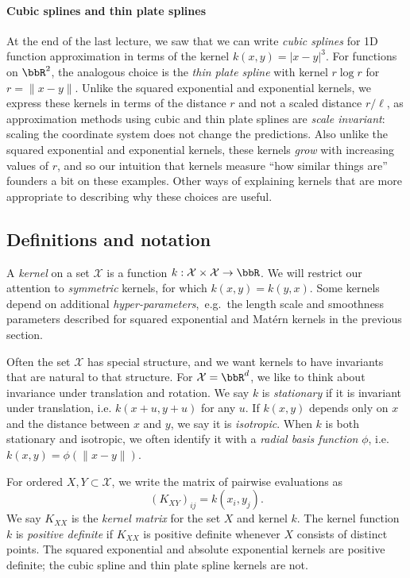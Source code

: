 \documentclass[12pt, leqno]{article} %
\begin{document}
\paragraph*{Cubic splines and thin plate splines}
At the end of the last lecture, we saw that we can write
{\em cubic splines} for 1D function approximation 
in terms of the kernel $k(x,y) = |x-y|^3$.  For functions
on $\bbR^2$, the analogous choice is the {\em thin plate spline}
with kernel $r \log r$ for $r = \|x-y\|$.  Unlike the squared
exponential and exponential kernels, we express these kernels in terms
of the distance $r$ and not a scaled distance $r/\ell$, as
approximation methods using cubic and thin plate splines are
{\em scale invariant}: scaling the coordinate system does not change
the predictions.  Also unlike the squared
exponential and exponential kernels, these kernels {\em grow} with
increasing values of $r$, and so our intuition that kernels measure
``how similar things are'' founders a bit on these examples.  Other
ways of explaining kernels that are more appropriate
to describing why these choices are useful.

\subsection{Definitions and notation}

A {\em kernel} on a set $\mathcal{X}$ is a function $k : \mathcal{X}
\times \mathcal{X} \rightarrow \bbR$.  We will restrict our attention
to {\em symmetric} kernels, for which $k(x,y) = k(y,x)$.  Some kernels
depend on additional {\em hyper-parameters},~e.g.~the length scale and
smoothness parameters described for squared exponential and Mat\'ern
kernels in the previous section.

Often the set $\mathcal{X}$ has special structure, and we want kernels
to have invariants that are natural to that structure.  For
$\mathcal{X} = \bbR^d$, we like to think about invariance under
translation and rotation.  We say $k$ is {\em stationary} if it is
invariant under translation, i.e. $k(x+u,y+u)$ for any $u$.  If
$k(x,y)$ depends only on $x$ and the distance between $x$ and $y$, we
say it is {\em isotropic}.  When $k$ is both stationary and isotropic,
we often identify it with a {\em radial basis function} $\phi$,
i.e. $k(x,y) = \phi(\|x-y\|)$.

For ordered $X, Y \subset \mathcal{X}$, we write the
matrix of pairwise evaluations as
\[
  (K_{XY})_{ij} = k(x_i,y_j).
\]
We say $K_{XX}$ is the {\em kernel matrix} for the set $X$ and kernel
$k$.  The kernel function $k$ is {\em positive definite} if
$K_{XX}$ is positive definite whenever $X$ consists of distinct
points.  The squared exponential and absolute exponential kernels
are positive definite; the cubic spline and thin plate spline
kernels are not.
\end{document}
